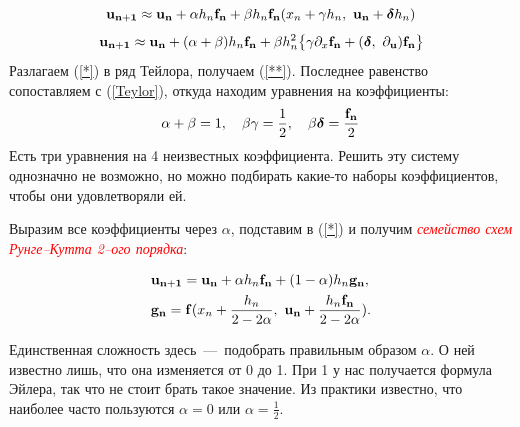 \documentclass[a4,14pt,russian]{article}
\begin{document}
    \begin{equation}\label{*}
        {\bf u_{n+1}} \approx {\bf u_{n}} + \alpha h_n {\bf f_{n}} + \beta {h_n} {\bf f_{n}}(x_n+\gamma h_n,\ {\bf u_{n}} + \boldsymbol{\delta} h_n)
    \end{equation}
    \begin{equation}\label{**}
        {\bf u_{n+1}} \approx {\bf u_{n}} + (\alpha + \beta) h_n {\bf f_{n}} + \beta h_n^2 \bigl\{ \gamma \partial_x {\bf f_n} + (\boldsymbol{\delta},\ \partial_{\bf u}) {\bf f_n} \bigr\}
    \end{equation}
    Разлагаем (\ref{*}) в ряд Тейлора, получаем (\ref{**}). Последнее равенство сопоставляем с (\ref{Teylor}), откуда находим уравнения на коэффициенты:
    \[
        \alpha + \beta = 1,\quad \beta \gamma = \frac12,\quad \beta \boldsymbol{\delta} = \frac{\bf f_n}2
    \]
    Есть три уравнения на 4 неизвестных коэффициента. Решить эту систему однозначно не возможно, но можно подбирать какие-то наборы коэффициентов, чтобы они удовлетворяли ей. \par
    Выразим все коэффициенты через $\alpha$, подставим в (\ref{*}) и получим \textcolor{red}{\it семейство схем Рунге--Кутта 2--ого порядка}:
    
    \begin{equation}\label{RUNGE-KUTA}
    \begin{split}
        &{\bf u_{n+1}} = {\bf u_{n}} + \alpha h_n {\bf f_{n}} + (1 - \alpha) {h_n} {\bf g_{n}},\\
        &{\bf g_{n}} = {\bf f}(x_n + \frac{h_n}{2-2\alpha},\ {\bf u_{n}} + \frac{h_n {\bf f_{n}}}{2-2\alpha}).
    \end{split}
    \end{equation}
    
    Единственная сложность здесь~---~подобрать правильным образом $\alpha$. О ней известно лишь, что она изменяется от 0 до 1. При 1 у нас получается формула Эйлера, так что не стоит брать такое значение. Из практики известно, что наиболее часто пользуются $\alpha = 0$ или $\alpha = \frac12$.
\end{document}
